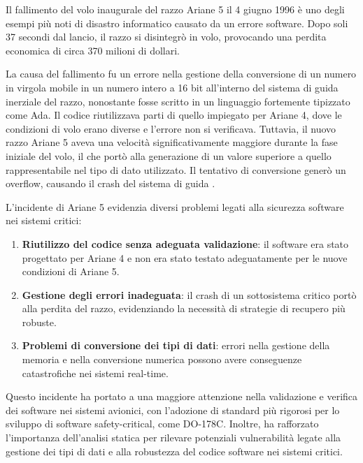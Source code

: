 Il fallimento del volo inaugurale del razzo Ariane 5 il 4 giugno 1996 è uno degli esempi più noti di disastro informatico causato da un errore software. Dopo soli 37 secondi dal lancio, il razzo si disintegrò in volo, provocando una perdita economica di circa 370 milioni di dollari.

La causa del fallimento fu un errore nella gestione della conversione di un numero in virgola mobile in un numero intero a 16 bit all'interno del sistema di guida inerziale del razzo, nonostante fosse scritto in un linguaggio fortemente tipizzato come Ada.
Il codice riutilizzava parti di quello impiegato per Ariane 4, dove le condizioni di volo erano diverse e l'errore non si verificava. Tuttavia, il nuovo razzo Ariane 5 aveva una velocità significativamente maggiore durante la fase iniziale del volo, il che portò alla generazione di un valore superiore a quello rappresentabile nel tipo di dato utilizzato. Il tentativo di conversione generò un overflow, causando il crash del sistema di guida \cite{Lions1996}.

L'incidente di Ariane 5 evidenzia diversi problemi legati alla sicurezza software nei sistemi critici:
\begin{enumerate}
    \item \textbf{Riutilizzo del codice senza adeguata validazione}: il software era stato progettato per Ariane 4 e non era stato testato adeguatamente per le nuove condizioni di Ariane 5.
    \item \textbf{Gestione degli errori inadeguata}: il crash di un sottosistema critico portò alla perdita del razzo, evidenziando la necessità di strategie di recupero più robuste.
    \item \textbf{Problemi di conversione dei tipi di dati}: errori nella gestione della memoria e nella conversione numerica possono avere conseguenze catastrofiche nei sistemi real-time.
\end{enumerate}

Questo incidente ha portato a una maggiore attenzione nella validazione e verifica dei software nei sistemi avionici, con l'adozione di standard più rigorosi per lo sviluppo di software safety-critical, come DO-178C. Inoltre, ha rafforzato l'importanza dell'analisi statica per rilevare potenziali vulnerabilità legate alla gestione dei tipi di dati e alla robustezza del codice software nei sistemi critici.